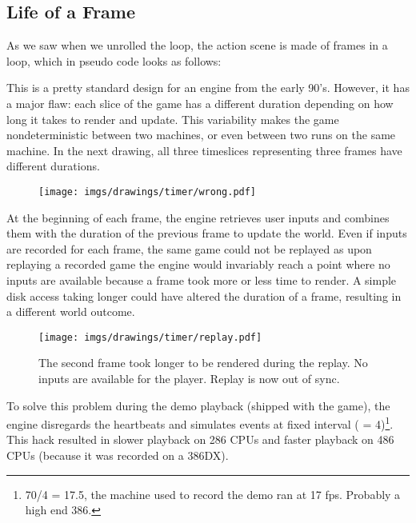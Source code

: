 \subsection{Life of a Frame}
As we saw when we unrolled the loop, the action scene is made of frames in a loop, which in pseudo code looks as follows:\\
\par
\begin{minipage}{\textwidth}
 
 \end{minipage}
\par
This is a pretty standard design for an engine from the early 90's. However, it has a major flaw: each slice of the game has a different duration depending on how long it takes to render and update. This variability makes the game nondeterministic between two machines, or even between two runs on the same machine. In the next drawing, all three timeslices representing three frames have different durations.\\
\begin{figure}[H]
\centering
 \texttt{[image: imgs/drawings/timer/wrong.pdf]}
 
 \end{figure}
  At the beginning of each frame, the engine retrieves user inputs and combines them with the duration of the previous frame to update the world. Even if inputs are recorded for each frame, the same game could not be replayed as upon replaying a recorded game the engine would invariably reach a point where no inputs are available because a frame took more or less time to render. A simple disk access taking longer could have altered the duration of a frame, resulting in a different world outcome.\\
 \begin{figure}[H]
\centering
 \texttt{[image: imgs/drawings/timer/replay.pdf]}
 \caption{The second frame took longer to be rendered during the replay. No inputs are available for the player. Replay is now out of sync.}
 \end{figure}
\par
To solve this problem during the demo playback (shipped with the game), the engine disregards the heartbeats and simulates events at fixed interval ( = 4)\footnote{70/4 = 17.5, the machine used to record the demo ran at 17 fps. Probably a high end 386.}. This hack resulted in slower playback on 286 CPUs and faster playback on 486 CPUs (because it was recorded on a 386DX).\\
